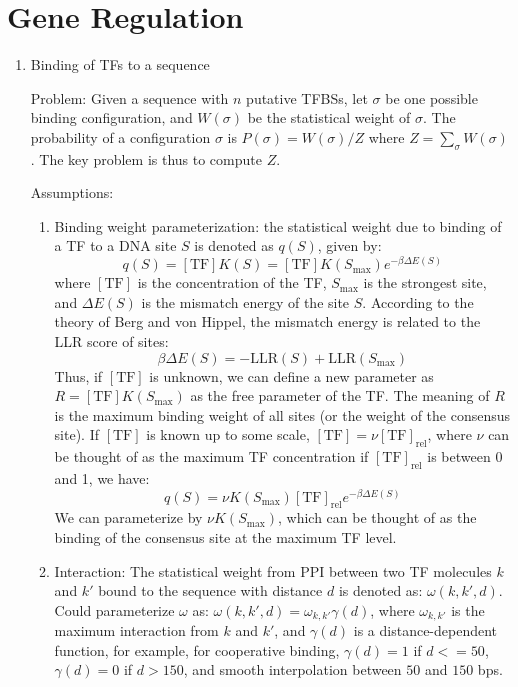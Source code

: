 \documentclass[11pt]{article}
\begin{document}
\section{Gene Regulation}
\begin{enumerate}

\item{Binding of TFs to a sequence}

Problem: Given a sequence with $n$ putative TFBSs, let $\sigma$ be one possible binding configuration, and $W(\sigma)$ be the statistical weight of $\sigma$. The probability of a configuration $\sigma$ is $P(\sigma) = W(\sigma) / Z$ where $Z = \sum_{\sigma}W(\sigma)$. The key problem is thus to compute $Z$. 

Assumptions: 
\begin{enumerate}
\item Binding weight parameterization: the statistical weight due to binding of a TF to a DNA site $S$ is denoted as $q(S)$, given by: 
\begin{equation}
q(S) = [\text{TF}] K(S) = [\text{TF}] K(S_{\max}) e^{-\beta \Delta E(S)} 
\end{equation}
where $[\text{TF}]$ is the concentration of the TF, $S_{\max}$ is the strongest site, and $\Delta E(S)$ is the mismatch energy of the site $S$. According to the theory of Berg and von Hippel, the mismatch energy is related to the LLR score of sites: 
\begin{equation}
\beta \Delta E(S) = -\text{LLR}(S) + \text{LLR}(S_{\max})
\end{equation}
Thus, if $[\text{TF}]$ is unknown, we can define a new parameter as $R = [\text{TF}] K(S_{\max})$ as the free parameter of the TF. The meaning of $R$ is the maximum binding weight of all sites (or the weight of the consensus site). If $[\text{TF}]$ is known up to some scale, $[\text{TF}] = \nu [\text{TF}]_{\text{rel}}$, where $\nu$ can be thought of as the maximum TF concentration if $[\text{TF}]_{\text{rel}}$ is between 0 and 1, we have: 
\begin{equation}
q(S) = \nu K(S_{\max}) [\text{TF}]_{\text{rel}} e^{-\beta \Delta E(S)} 
\end{equation}
We can parameterize by $\nu K(S_{\max})$, which can be thought of as the binding of the consensus site at the maximum TF level. 

\item Interaction: The statistical weight from PPI between two TF molecules $k$ and $k'$ bound to the sequence with distance $d$ is denoted as: $\omega(k,k',d)$. Could parameterize $\omega$ as: $\omega(k,k',d) = \omega_{k,k'} \gamma(d)$, where $\omega_{k,k'}$ is the maximum interaction from $k$ and $k'$, and $\gamma(d)$ is a distance-dependent function, for example, for cooperative binding, $\gamma(d) = 1$ if $d <= 50$, $\gamma(d) = 0$ if $d > 150$, and smooth interpolation between $50$ and $150$ bps. 


\end{enumerate}
\end{enumerate}
\end{document}
